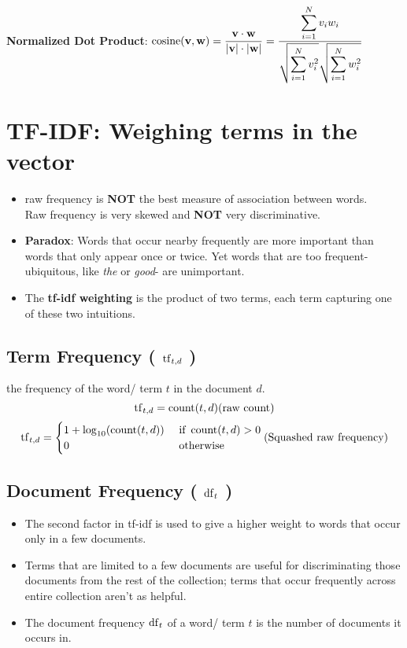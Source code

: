 \textbf{Normalized Dot Product}: \( \displaystyle \operatorname{cosine}(\mathbf{v,w}) = \frac{\mathbf{v\cdot w}}{|\mathbf{v}|\cdot|\mathbf{w}|} = \frac{\displaystyle\sum_{i=1}^{N} v_i w_i}{\displaystyle \sqrt{\sum_{i=1}^{N} v_i^2}\sqrt{\sum_{i=1}^{N} w_i^2}} \)


\section{TF-IDF: Weighing terms in the vector \cite{nlp-1}}\label{TF-IDF: Weighing terms in the vector}

\begin{itemize}
    \item raw frequency is \textbf{NOT} the best measure of association between words.\\
    Raw frequency is very skewed and \textbf{NOT} very discriminative.

    \item \textbf{Paradox}: Words that occur nearby frequently are more important than words that only appear once or twice. Yet words that are too frequent-ubiquitous, like \textit{the} or \textit{good}- are unimportant.

    \item The \textbf{tf-idf weighting} is the product of two terms, each term capturing one of these two intuitions.
\end{itemize}


\subsection{Term Frequency ( $\operatorname{tf}_{t,d}$ ) \cite{nlp-1}} \label{Term Frequency}

the frequency of the word/ term $t$ in the document $d$.
\[
    \rcmdXtf_{t,d} = \rcmdXcount(t,d) \hfill \text{(raw count)}
\]
\[
    \rcmdXtf_{t,d} = \begin{cases}
        1 + \log_{10}(\rcmdXcount(t,d)) & \text{ if } \rcmdXcount(t,d) > 0\\
        0 & \text{ otherwise}
    \end{cases} \hfill \text{(Squashed raw frequency)}
\]

\subsection{Document Frequency ( $\operatorname{df}_t$ ) \cite{nlp-1}}\label{Document Frequency}

\begin{itemize}
    \item The second factor in tf-idf is used to give a higher weight to words that occur only in a few documents.

    \item Terms that are limited to a few documents are useful for discriminating those documents from the rest of the collection; terms that occur frequently across entire collection aren't as helpful.

    \item The document frequency $\operatorname{df}_t$ of a word/ term $t$ is the number of documents it occurs in.

    
\end{itemize}


